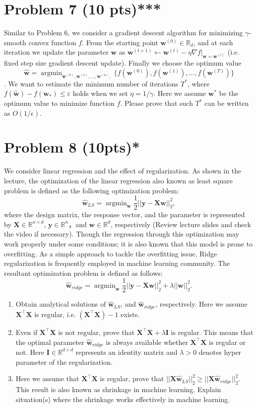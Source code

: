 \documentclass{jsarticle}
\DeclareMathOperator*{\argmin}{argmin}
\begin{document}
\section*{Problem 7 (10 pts)***}
Similar to Problem 6, we consider a gradient descent algorithm for minimizing $\gamma$-smooth convex function $f$. From the starting point $\bm w^{(0)} \in \mathbb R_d$, and at each iteration we update the parameter $\bm w$ as $\bm w^{(t+1)} \leftarrow \bm w^{(t)} − \eta \nabla f|_{\bm w=\bm w^{(t)}}$ (i.e. fixed step size gradient descent update). Finally we choose the optimum value
$$
\hat{\bm w} = \argmin_{\bm w^{(0)},\bm w^{(1)},\ldots,\bm w^{(n)},} \{f(\bm w^{(0)}),f(\bm w^{(1)}),\ldots,f(\bm w^{(T)})\}
$$
. We want to estimate the minimum number of iterations $T^*$, where $f(\hat{\bm w})−f(\bm w_*) \le \varepsilon$ holds when we set $\eta = 1/\gamma$. Here we assume $\bm w^*$ be the optimum value to minimize function $f$. Please prove that such $T^*$ can be written as $O(1/\epsilon)$.

\section*{Problem 8 (10pts)*}
We consider linear regression and the effect of regularization. As shown in the lecture, the optimization of the linear regression also known as least square problem is defined as the following optimization problem:
$$
\hat{\bm w}_{LS} = \argmin_{\bm w} \frac{1}{2}||\bm y − \bm X\bm w||_2^2,
$$
where the design matrix, the response vector, and the parameter is represented by $\bm X \in \mathbb R^{n×d}$, $\bm y \in \mathbb R^n$，and $\bm w \in \mathbb R^d$, respectively (Review lecture slides and check the video if necessary). Though the regression through this optimization may work properly under some conditions; it is also known that this model is prone to overfitting. As a simple approach to tackle the overfitting issue, Ridge regularization is frequently employed in machine learning community. The resultant optimization problem is defined as follows:
$$
\hat{\bm w}_{ridge} = \argmin_{\bm w} \frac{1}{2}||\bm y − \bm X\bm w||_2^2 + \lambda||\bm w||_2^2.
$$
\begin{enumerate}
  \item Obtain analytical solutions of $\hat{\bm w}_{LS}$, and $\hat{\bm w}_{ridge}$, respectively. Here we assume $\bm X^\top \bm X$ is regular, i.e. $(\bm X^\top \bm X)−1$ exists.
  \item Even if $\bm X^\top \bm X$ is not regular, prove that $\bm X^\top \bm X + \lambda \bm I$ is regular. This means that the optimal parameter $\hat{\bm w}_{ridge}$ is always available whether $\bm X^\top \bm X$ is regular or not. Here $\bm I \in \mathbb R^{d×d}$ represents an identity matrix and $\lambda > 0$ denotes hyper parameter of the regularization.
  \item Here we assume that $\bm X^\top \bm X$ is regular, prove that $||\bm X\hat{\bm w}_{LS}||_2^2 \ge ||\bm X\hat{\bm w}_{ridge}||_2^2$. This result is also known as shrinkage in machine learning. Explain situation(s) where the shrinkage works effectively in machine learning. 
\end{enumerate}
　
\end{document}
